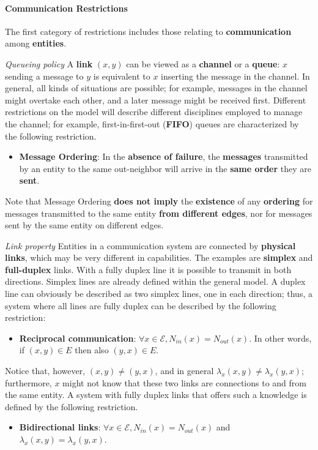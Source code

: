 \paragraph{Communication Restrictions} 
The first category of restrictions includes those relating to \textbf{communication} among \textbf{entities}.

\textit{Queueing policy} A \textbf{link} $(x, y)$ can be viewed as a \textbf{channel} or a \textbf{queue}: $x$ sending a message to $y$ is equivalent to $x$ inserting the message in the channel. In general, all kinds of situations are possible; for example, messages in the channel might overtake each other, and a later message might be received first. Different restrictions on the model will describe different disciplines employed to manage the channel; for example, first-in-first-out (\textbf{FIFO}) queues are characterized by the following restriction.

\begin{itemize}
    \item \textbf{Message Ordering}: In the \textbf{absence of failure}, the \textbf{messages} transmitted by an entity to the same out-neighbor will arrive in the \textbf{same order} they are \textbf{sent}.
\end{itemize}

Note that Message Ordering \textbf{does not imply} the \textbf{existence} of any \textbf{ordering} for messages transmitted to the same entity \textbf{from different edges}, nor for messages sent by the same entity on different edges.

\textit{Link property} Entities in a communication system are connected by \textbf{physical links}, which may be very different in capabilities. The examples are \textbf{simplex} and \textbf{full-duplex} links. With a fully duplex line it is possible to transmit in both directions. Simplex lines are already defined within the general model. A duplex line can obviously be described as two simplex lines, one in each direction; thus, a system where all lines are fully duplex can be described by the following restriction:

\begin{itemize}
    \item \textbf{Reciprocal communication}: $\forall x \in \mathcal{E}, N_{in}(x) = N_{out}(x)$. In other words, if $(x, y) \in E$ then also $(y, x) \in E$.
\end{itemize}

Notice that, however, $(x, y) \neq (y, x)$, and in general $\lambda_x(x, y) \neq \lambda_x(y, x)$; furthermore, $x$ might not know that these two links are connections to and from the same entity. A system with fully duplex links that offers such a knowledge is defined by the following restriction.
\begin{itemize}
    \item \textbf{Bidirectional links}: $\forall x \in \mathcal{E}, N_{in}(x) = N_{out}(x)$ and $\lambda_x(x, y) = \lambda_x(y, x)$.
\end{itemize}

